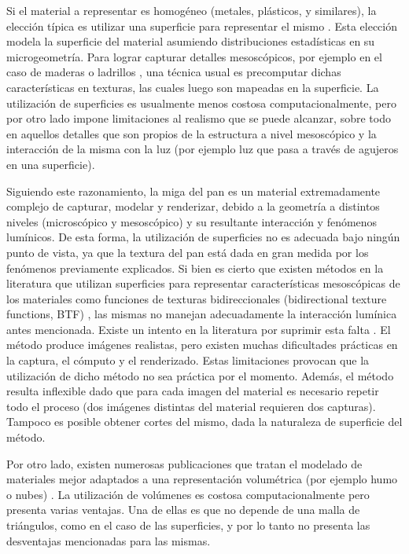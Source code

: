 \documentclass[spanish,a4paper,11pt,oneside,links]{report}
\begin{document}
Si el material a representar es homogéneo (metales, plásticos, y similares), la elección típica es utilizar una superficie para representar el mismo \cite{Neumann1999}.
Esta elección modela la superficie del material asumiendo distribuciones estadísticas en su microgeometría.
Para lograr capturar detalles mesoscópicos, por ejemplo en el caso de maderas o ladrillos \cite{Lefebvre2000}, una técnica usual es precomputar dichas características en texturas, las cuales luego son mapeadas en la superficie.
La utilización de superficies es usualmente menos costosa computacionalmente, pero por otro lado impone limitaciones al realismo que se puede alcanzar, sobre todo en aquellos detalles que son propios de la estructura a nivel mesoscópico y la interacción de la misma con la luz (por ejemplo luz que pasa a través de agujeros en una superficie).

Siguiendo este razonamiento, la miga del pan es un material extremadamente complejo de capturar, modelar y renderizar, debido a la geometría a distintos niveles (microscópico y mesoscópico) y su resultante interacción y fenómenos lumínicos.
De esta forma, la utilización de superficies no es adecuada bajo ningún punto de vista, ya que la textura del pan está dada en gran medida por los fenómenos previamente explicados.
Si bien es cierto que existen métodos en la literatura que utilizan superficies para representar características mesoscópicas de los materiales como funciones de texturas bidireccionales (bidirectional texture functions, BTF) \cite{Tong2002}, las mismas no manejan adecuadamente la interacción lumínica antes mencionada.
Existe un intento en la literatura por suprimir esta falta \cite{Tong2005}.
El método produce imágenes realistas, pero existen muchas dificultades prácticas en la captura, el cómputo y el renderizado.
Estas limitaciones provocan que la utilización de dicho método no sea práctica por el momento.
Además, el método resulta inflexible dado que para cada imagen del material es necesario repetir todo el proceso (dos imágenes distintas del material requieren dos capturas).
Tampoco es posible obtener cortes del mismo, dada la naturaleza de superficie del método.

Por otro lado, existen numerosas publicaciones que tratan el modelado de materiales mejor adaptados a una representación volumétrica (por ejemplo humo o nubes) \cite{Chentanez2011,Zhou2008}.
La utilización de volúmenes es costosa computacionalmente pero presenta varias ventajas. Una de ellas es que no depende de una malla de triángulos, como en el caso de las superficies, y por lo tanto no presenta las desventajas mencionadas para las mismas.
\end{document}
